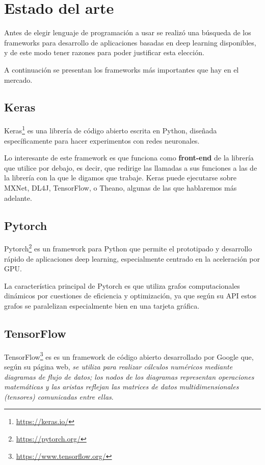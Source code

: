 \chapter{Estado del arte}
\label{chap:art}

Antes de elegir lenguaje de programación a usar se realizó una búsqueda de los frameworks para desarrollo de aplicaciones basadas en deep learning disponibles, y de este modo tener razones para poder justificar esta elección.

\bigskip

A continuación se presentan los frameworks más importantes que hay en el mercado.

\section{Keras}

Keras\footnote{\url{https://keras.io/}} es una librería de código abierto escrita en Python, diseñada específicamente para hacer experimentos con redes neuronales.

\bigskip

Lo interesante de este framework es que funciona como \textbf{front-end} de la librería que utilice por debajo, es decir, que redirige las llamadas a sus funciones a las de la librería con la que le digamos que trabaje. Keras puede ejecutarse sobre MXNet, DL4J, TensorFlow, o Theano, algunas de las que hablaremos más adelante.

\section{Pytorch}

Pytorch\footnote{\url{https://pytorch.org/}} es un framework para Python que permite el prototipado y desarrollo rápido de aplicaciones deep learning, especialmente centrado en la aceleración por GPU.

\bigskip

La característica principal de Pytorch es que utiliza grafos computacionales dinámicos por cuestiones de eficiencia y optimización, ya que según su API estos grafos se paralelizan especialmente bien en una tarjeta gráfica.

\section{TensorFlow}

TensorFlow\footnote{\url{https://www.tensorflow.org/}} es es un framework de código abierto desarrollado por Google que, según su página web, \textit{se utiliza para realizar cálculos numéricos mediante diagramas de flujo de datos; los nodos de los diagramas representan operaciones matemáticas y las aristas reflejan las matrices de datos multidimensionales (tensores) comunicadas entre ellas}.

